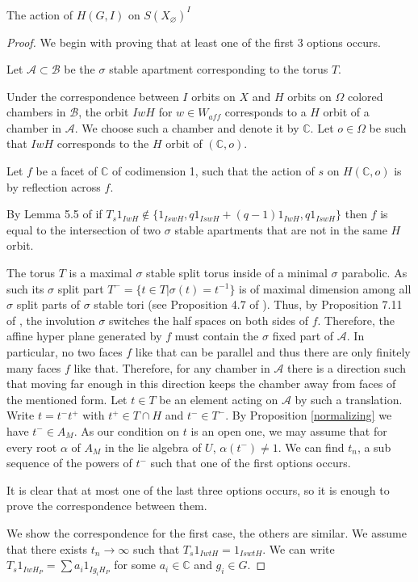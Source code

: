 \documentclass[12pt]{article}
\newcommand{\A}{\mathcal{A}}
\newcommand{\B}{\mathcal{B}}
\newcommand{\C}{\mathbb{C}}
\newcommand{\<}{\langle}
\renewcommand{\>}{\rangle}
\renewcommand{\emptyset}{\varnothing}
\theoremstyle{plain}
\theoremstyle{definition}
\begin{document}
\begin{subsection}{The action of $H(G,I)$ on $S(X_\emptyset)^I$}
\begin{proof}
We begin with proving that at least one of the first 3 options occurs. 

Let $\A\subset \B$ be the $\sigma$ stable apartment corresponding to the torus $T$.

Under the correspondence between $I$ orbits on $X$ and $H$ orbits on $\Omega$ colored chambers in $\B$, the orbit  $IwH$ for $w\in W_{aff}$ corresponds to a $H$ orbit of a  chamber in $\A$. We choose such a chamber and denote it by $\C$. Let $o\in \Omega$ be such that $IwH$ corresponds to the $H$ orbit of $(\C,o)$.

Let $f$ be a facet of $\C$ of codimension 1, such that the action of $s$ on $H(\C,o)$ is by reflection across $f$. 


By Lemma 5.5 of \cite{my} if $T_s1_{IwH}\notin \{1_{IswH},q1_{IswH}+(q-1)1_{IwH},q1_{IswH}\}$ then $f$ is equal to the intersection of two $\sigma$ stable apartments that are not in the same $H$ orbit.

The torus $T$ is a maximal $\sigma$ stable split torus inside of a minimal $\sigma$ parabolic. As such its $\sigma$ split part $T^-=\{t\in T|\sigma(t)=t^{-1}\}$ is of maximal dimension among all $\sigma$ split parts of $\sigma$ stable tori (see Proposition 4.7 of \cite{Helminck}). Thus, by Proposition 7.11 of \cite{my}, the involution $\sigma$ switches the half spaces on both sides of $f$. Therefore, the affine hyper plane generated by $f$ must contain the $\sigma$ fixed part of $\A$. In particular, no two faces $f$ like that can be parallel and thus there are only finitely many faces $f$ like that. Therefore, for any chamber in $\A$ there is a direction such that moving far enough in this direction keeps the chamber away from faces of the mentioned form. Let $t\in T$ be an element acting on $\A$ by such a translation. Write $t=t^-t^+$ with $t^+\in T\cap H$ and $t^-\in T^-$. By Proposition \ref{normalizing} we have $t^-\in A_M$. As our condition on $t$ is an open one, we may assume that for every root $\alpha$ of $A_M$ in the lie algebra of $U$, $\alpha(t^-)\neq 1$. We can find $t_n$, a sub sequence of the powers of $t^-$ such that one of the first options occurs.

It is clear that at most one of the last three options occurs, so it is enough to prove the correspondence between them.

We show the correspondence for the first case, the others are similar.
We assume that there exists $t_n\rightarrow\infty$ such that $T_s1_{IwtH}=1_{IswtH}$.
We can write $T_s1_{IwH_P}=\sum a_i1_{Ig_iH_P}$ for some $a_i\in\mathbb{C}$ and $g_i\in G$.


\end{proof}
\end{subsection}
\end{document}
